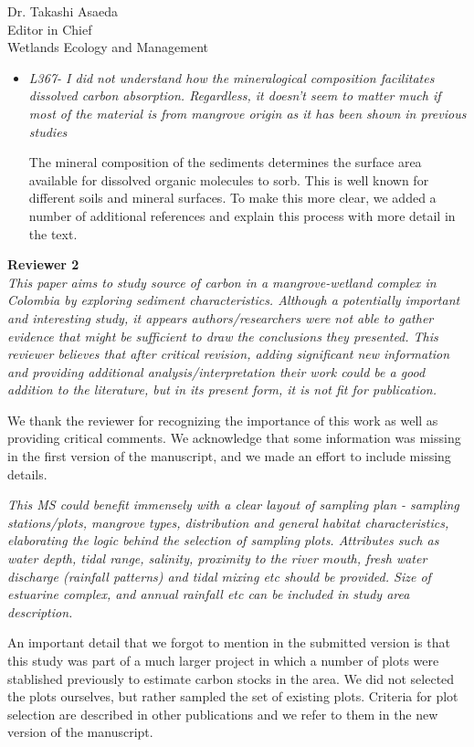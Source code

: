 \documentclass[11pt]{bgcletter}
\begin{document}
\begin{letter}{Dr. Takashi Asaeda\\
 Editor in Chief \\ Wetlands Ecology and Management}
\begin{itemize}
\item {\it L367- I did not understand how the mineralogical composition facilitates dissolved carbon absorption. Regardless, it doesn't seem to matter much if most of the material is from mangrove origin as it has been shown in previous studies}

{\color{blue} The mineral composition of the sediments determines the surface area available for dissolved organic molecules to sorb. This is well known for different soils and mineral surfaces. To make this more clear, we added a number of additional references and explain this process with more detail in the text. }

\end{itemize}

{\bf Reviewer 2} \\
{\it This paper aims to study source of carbon in a mangrove-wetland complex in Colombia by exploring sediment characteristics. Although a potentially important and interesting study, it appears authors/researchers were not able to gather evidence that might be sufficient to draw the conclusions they presented. This reviewer believes that after critical revision, adding significant new information and providing additional analysis/interpretation their work could be a good addition to the literature, but in its present form, it is not fit for publication.}

{\color{blue} We thank the reviewer for recognizing the importance of this work as well as providing critical comments. We acknowledge that some information was missing in the first version of the manuscript, and we made an effort to include missing details.}

{\it This MS could benefit immensely with a clear layout of sampling plan - sampling stations/plots, mangrove types, distribution and general habitat characteristics, elaborating the logic behind the selection of sampling plots. Attributes such as water depth, tidal range, salinity, proximity to the river mouth, fresh water discharge (rainfall patterns) and tidal mixing etc should be provided. Size of estuarine complex, and annual rainfall etc can be included in study area description.}

{\color{blue} An important detail that we forgot to mention in the submitted version is that this study was part of a much larger project in which a number of plots were stablished previously to estimate carbon stocks in the area. We did not selected the plots ourselves, but rather sampled the set of existing plots. Criteria for plot selection are described in other publications and we refer to them in the new version of the manuscript. }


\end{letter}
\end{document}
